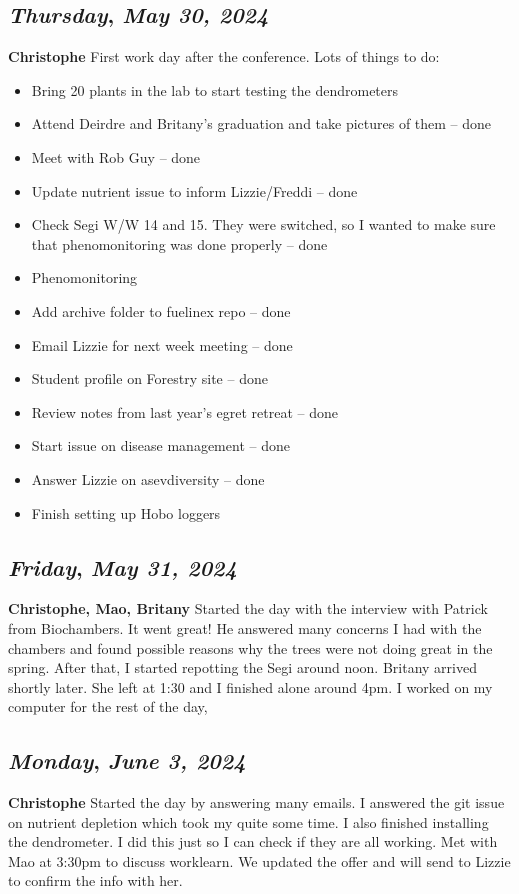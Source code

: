 \def\day{\textit{May 30, 2024}}
\def\weekday{\textit{Thursday}}
\subsection*{\weekday, \day}
\textbf{Christophe}
First work day after the conference. Lots of things to do:
\begin{itemize}
    \item Bring 20 plants in the lab to start testing the dendrometers
    \item Attend Deirdre and Britany's graduation and take pictures of them -- done
    \item Meet with Rob Guy -- done
    \item Update nutrient issue to inform Lizzie/Freddi -- done 
    \item Check Segi W/W 14 and 15. They were switched, so I wanted to make sure that phenomonitoring was done properly -- done
    \item Phenomonitoring
    \item Add archive folder to fuelinex repo  -- done
    \item Email Lizzie for next week meeting -- done
    \item Student profile on Forestry site -- done 
    \item Review notes from last year's egret retreat -- done
    \item Start issue on disease management -- done
    \item Answer Lizzie on asevdiversity -- done
    \item Finish setting up Hobo loggers 
\end{itemize}

\def\day{\textit{May 31, 2024}}
\def\weekday{\textit{Friday}}
\subsection*{\weekday, \day}
\textbf{Christophe, Mao, Britany}
Started the day with the interview with Patrick from Biochambers. It went great! He answered many concerns I had with the chambers and found possible reasons why the trees were not doing great in the spring. After that, I started repotting the Segi around noon. Britany arrived shortly later. She left at 1:30 and I finished alone around 4pm. I worked on my computer for the rest of the day, 

\def\day{\textit{June 3, 2024}}
\def\weekday{\textit{Monday}}
\subsection*{\weekday, \day}
\textbf{Christophe}
Started the day by answering many emails. I answered the git issue on nutrient depletion which took my quite some time. I also finished installing the dendrometer. I did this just so I can check if they are all working.
Met with Mao at 3:30pm to discuss worklearn. We updated the offer and will send to Lizzie to confirm the info with her. 





